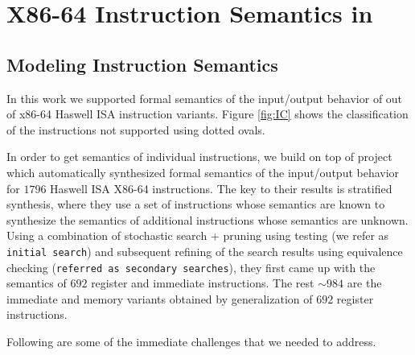 
\section{X86-64 Instruction Semantics in \K} \label{sec:modelI}

\subsection{Modeling Instruction Semantics}


In this work we supported formal semantics of the input/output behavior of
\supp{} out of \total{} x86-64 Haswell ISA instruction variants. Figure \ref{fig:IC} shows the classification of the instructions not supported using dotted ovals.  


In order to get semantics of individual instructions, we build on top of project
\Strata~\cite{Heule2016a} which automatically synthesized formal semantics  of
the input/output behavior for $1796$ Haswell ISA X86-64 instructions. The key to
their results is stratified synthesis, where they use a set of instructions
whose semantics are known to synthesize the semantics of additional instructions
whose semantics are unknown. Using a  combination of stochastic search + pruning
using testing (we refer as {\tt initial search}) and subsequent refining of the
search results using equivalence checking ({\tt referred as secondary
    searches}), they first came up with the semantics of $692$ register and
 immediate instructions. The rest $\sim984$ are the immediate
and memory variants obtained by generalization of $692$ register instructions.     




Following are some of the immediate challenges that we needed to address.

